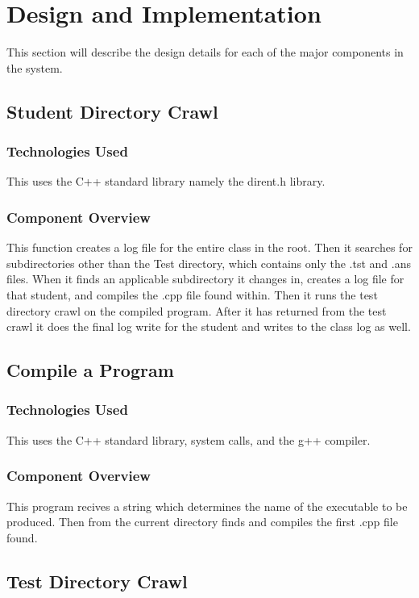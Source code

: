 \chapter{Design  and Implementation}
This section will describe the design details for each of the major components 
in the system. 
 
\section{Student Directory Crawl}

\subsection {Technologies Used}
This uses the C++ standard library namely the dirent.h library.

\subsection{Component Overview}
This function creates a log file for the entire class in the root.  Then it searches for subdirectories other than the
Test directory, which contains only the .tst and .ans files.  When it finds an applicable subdirectory it changes in,
creates a log file for that student, and compiles the .cpp file found within.  Then it runs the test directory crawl
on the compiled program.  After it has returned from the test crawl it does the final log write for the student and
writes to the class log as well.


\section {Compile a Program}

\subsection {Technologies Used}
This uses the C++ standard library, system calls, and the g++ compiler.

\subsection{Component Overview}
This program recives a string which determines the name of the executable to be produced.  Then from the
current directory finds and compiles the first .cpp file found.


\section{Test Directory Crawl}

